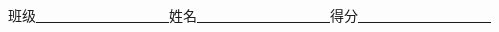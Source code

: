 \documentclass[cs4size,UTF8]{ctexart}
\begin{document}
\fancyhf{}
	
\begin{spacing}{1.25}
	\begin{center}
\begin{LARGE}
\end{LARGE}
\end{center}
\end{spacing}
\vspace{0.2cm}

\begin{center}
班级\underline{~~~~~~~~~~~~~~~~~~~}姓名\underline{~~~~~~~~~~~~~~~~~~~}得分\underline{~~~~~~~~~~~~~~~~~~~}
\end{center}
\end{document}
